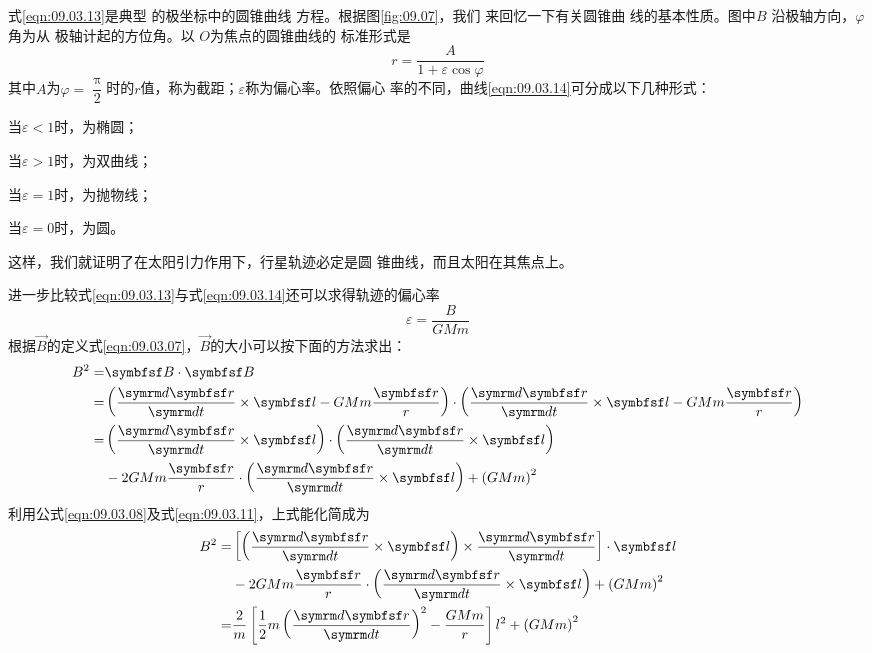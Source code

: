 式\eqref{eqn:09.03.13}是典型
的极坐标中的圆锥曲线
方程。根据图\ref{fig:09.07}，我们
来回忆一下有关圆锥曲
线的基本性质。图中$ B $
沿极轴方向，$ \varphi $角为从
极轴计起的方位角。以
$ O $为焦点的圆锥曲线的
标准形式是
\begin{equation}\label{eqn:09.03.14}
  r = \frac { A } { 1 + \varepsilon \cos \varphi }
\end{equation}
其中$ A $为$ \varphi = \dfrac { \uppi } { 2 } $时的$ r $值，称为截距；$ \varepsilon $称为偏心率。依照偏心
率的不同，曲线\eqref{eqn:09.03.14}可分成以下几种形式：

当$ \varepsilon < 1 $时，为椭圆；

当$ \varepsilon > 1 $时，为双曲线；

当$ \varepsilon = 1 $时，为抛物线；

当$ \varepsilon = 0 $时，为圆。

这样，我们就证明了在太阳引力作用下，行星轨迹必定是圆
锥曲线，而且太阳在其焦点上。

进一步比较式\eqref{eqn:09.03.13}与式\eqref{eqn:09.03.14}还可以求得轨迹的偏心率
\begin{equation}\label{eqn:09.03.15}
  \varepsilon = \frac { B } { G M m }
\end{equation}
根据$ \vec{B} $的定义式\eqref{eqn:09.03.07}，$\vec{B}$的大小可以按下面的方法求出：
\begin{equation*}
  \begin{split}
    B ^ { 2 } =& \vec{B} \cdot \vec{B} \\
    =& \left( \frac { \dif \vec{r} } { \dif t } \times \vec{l} - G M m \frac { \vec{r} } { r } \right) \cdot \left( \frac { \dif \vec{r} } { \dif t } \times \vec{l} - G M m \frac { \vec{r} } { r } \right) \\
    =& \left( \frac { \dif \vec{r} } { \dif t } \times \vec{l} \right) \cdot \left( \frac { \dif \vec{r} } { \dif t } \times \vec{l} \right) \\
    & - 2 G M m \frac { \vec{r} } { r } \cdot \left( \frac { \dif \vec{r} } { \dif t } \times \vec{l} \right) + \left( G M m \right) ^ { 2 }
  \end{split}
\end{equation*}
利用公式\eqref{eqn:09.03.08}及式\eqref{eqn:09.03.11}，上式能化简成为
\begin{equation*}
  \begin{split}
    B ^ { 2 } =& \left[ \left( \frac { \dif \vec{r} } { \dif t } \times \vec{l} \right) \times \frac { \dif \vec{r} } { \dif t } \right] \cdot \vec{ l } \\
    &- 2 G M m \frac { \vec{r} } { r } \cdot \left( \frac { \dif \vec{r} } { \dif t } \times \vec{l} \right) + \left( G M m \right) ^ { 2 } \\
    =& \frac { 2 } { m } \left[ \frac { 1 } { 2 } m \left( \frac { \dif \vec{r} } { \dif t } \right) ^ { 2 } - \frac { G M m } { r } \right] l ^ { 2 } + \left( G M m \right) ^ { 2 }
  \end{split}
\end{equation*}

